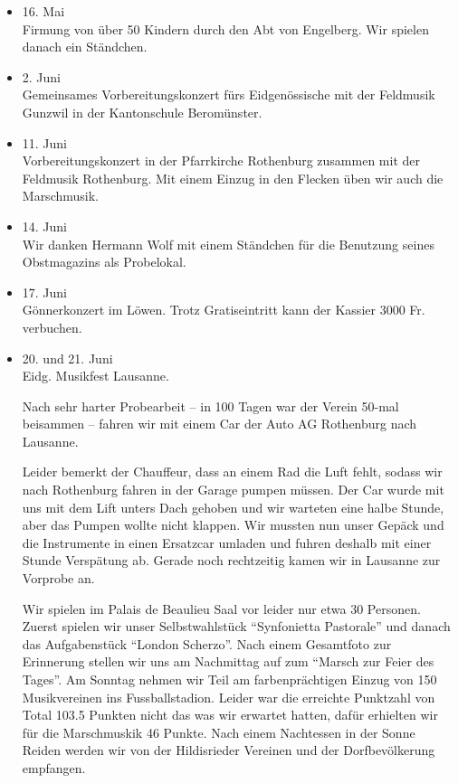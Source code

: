 \begin{history}
\begin{itemize}
        \item 16. Mai\\
              Firmung von über 50 Kindern durch den Abt von Engelberg. Wir spielen
              danach ein Ständchen.

        \item 2. Juni\\
              Gemeinsames Vorbereitungskonzert fürs Eidgenössische mit der Feldmusik
              Gunzwil in der Kantonschule Beromünster.

        \item 11. Juni\\
              Vorbereitungskonzert in der Pfarrkirche Rothenburg zusammen mit der
              Feldmusik Rothenburg. Mit einem Einzug in den Flecken üben wir auch die
              Marschmusik.

        \item 14. Juni\\
              Wir danken Hermann Wolf mit einem Ständchen für die Benutzung seines
              Obstmagazins als Probelokal.

        \item 17. Juni\\
              Gönnerkonzert im Löwen. Trotz Gratiseintritt kann der Kassier 3000 Fr.
              verbuchen.

        \item 20. und 21. Juni\\
              Eidg. Musikfest Lausanne.

              Nach sehr harter Probearbeit -- in 100 Tagen war der Verein 50-mal
              beisammen -- fahren wir mit einem Car der Auto AG Rothenburg nach
              Lausanne.

              Leider bemerkt der Chauffeur, dass an einem Rad die Luft fehlt, sodass
              wir nach Rothenburg fahren in der Garage pumpen müssen. Der Car wurde
              mit uns mit dem Lift unters Dach gehoben und wir warteten eine halbe
              Stunde, aber das Pumpen wollte nicht klappen. Wir mussten nun unser
              Gepäck und die Instrumente in einen Ersatzcar umladen und fuhren deshalb
              mit einer Stunde Verspätung ab. Gerade noch rechtzeitig kamen wir in
              Lausanne zur Vorprobe an.

              Wir spielen im Palais de Beaulieu Saal vor leider nur etwa 30 Personen.
              Zuerst spielen wir unser Selbstwahlstück \enquote{Synfonietta Pastorale} und
              danach das Aufgabenstück \enquote{London Scherzo}. Nach einem Gesamtfoto zur
              Erinnerung stellen wir uns am Nachmittag auf zum \enquote{Marsch zur Feier des
                  Tages}. Am Sonntag nehmen wir Teil am farbenprächtigen Einzug von 150
              Musikvereinen ins Fussballstadion. Leider war die erreichte Punktzahl
              von Total 103.5 Punkten nicht das was wir erwartet hatten, dafür
              erhielten wir für die Marschmuskik 46 Punkte. Nach einem Nachtessen in
              der Sonne Reiden werden wir von der Hildisrieder Vereinen und der
              Dorfbevölkerung empfangen.


\end{itemize}
\end{history}
